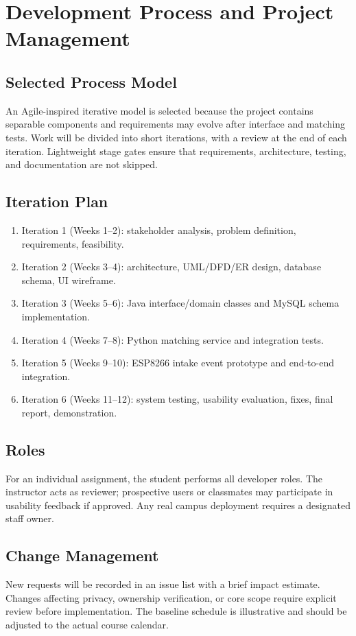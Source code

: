 \documentclass[12pt,a4paper]{report}
\begin{document}
\chapter{Development Process and Project Management}
\section{Selected Process Model}
An Agile-inspired iterative model is selected because the project contains separable components and requirements may evolve after interface and matching tests. Work will be divided into short iterations, with a review at the end of each iteration. Lightweight stage gates ensure that requirements, architecture, testing, and documentation are not skipped.

\section{Iteration Plan}
\begin{enumerate}
\item Iteration 1 (Weeks 1--2): stakeholder analysis, problem definition, requirements, feasibility.
\item Iteration 2 (Weeks 3--4): architecture, UML/DFD/ER design, database schema, UI wireframe.
\item Iteration 3 (Weeks 5--6): Java interface/domain classes and MySQL schema implementation.
\item Iteration 4 (Weeks 7--8): Python matching service and integration tests.
\item Iteration 5 (Weeks 9--10): ESP8266 intake event prototype and end-to-end integration.
\item Iteration 6 (Weeks 11--12): system testing, usability evaluation, fixes, final report, demonstration.
\end{enumerate}

\section{Roles}
For an individual assignment, the student performs all developer roles. The instructor acts as reviewer; prospective users or classmates may participate in usability feedback if approved. Any real campus deployment requires a designated staff owner.

\section{Change Management}
New requests will be recorded in an issue list with a brief impact estimate. Changes affecting privacy, ownership verification, or core scope require explicit review before implementation. The baseline schedule is illustrative and should be adjusted to the actual course calendar.
\end{document}
